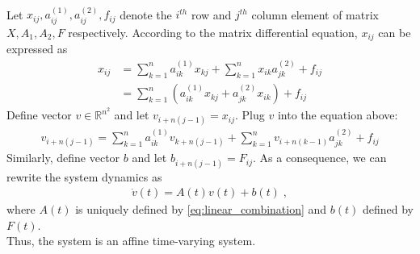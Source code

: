 \documentclass[a4paper,10.5pt]{article}
\newcommand{\R}{\mathbb{R}}
\begin{document}
 \\
Let $x_{ij},a^{(1)}_{ij},a^{(2)}_{ij},f_{ij}$ denote the $i^{th}$ row and $j^{th}$ column element of matrix $X,A_1,A_2,F$ respectively. According to the matrix differential equation, $x_{ij}$ can be expressed as
\begin{align*}
x_{ij} &= \sum_{k=1}^{n} a^{(1)}_{ik}x_{kj} + \sum_{k=1}^{n}x_{ik}a^{(2)}_{jk} + f_{ij} \\
&= \sum_{k=1}^{n} \left(a^{(1)}_{ik}x_{kj} + a^{(2)}_{jk}x_{ik}\right) + f_{ij}
\end{align*}
Define vector $v \in \R^{n^2}$ and let $v_{i+n(j-1)}=x_{ij}$. Plug $v$ into the equation above:
\begin{align}
\label{eq:linear_combination}
v_{i+n(j-1)} = \sum_{k=1}^{n} a^{(1)}_{ik}v_{k+n(j-1)} + \sum_{k=1}^{n}v_{i+n(k-1)}a^{(2)}_{jk} + f_{ij}
\end{align}
Similarly, define vector $b$ and let $b_{i+n(j-1)}=F_{ij}$.
As a consequence, we can rewrite the system dynamics as
\begin{align*}
\dot{v}(t) = A(t)v(t)+b(t) \; ,
\end{align*}
where $A(t)$ is uniquely defined by \eqref{eq:linear_combination} and $b(t)$ defined by $F(t)$. \\
Thus, the system is an affine time-varying system. \\
\end{document}
